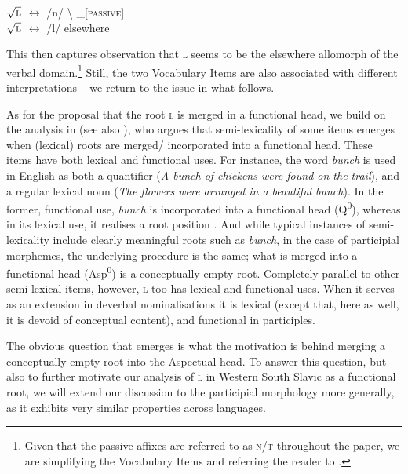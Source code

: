 \documentclass[output=paper,colorlinks,citecolor=brown]{langscibook}
\begin{document}
 \ea     $\sqrt{\textsc{l}}$  $\leftrightarrow$ /n/ \textbackslash \hspace{0.3cm} \_\textsc{[passive]}  \\
      \textcolor{white}{$\sqrt{\textsc{l}}$} $\leftrightarrow$ /l/ \hspace{0.3cm} elsewhere\\
   
\z 

\noindent This then captures  observation that \textsc{l} seems to be the elsewhere allomorph of the verbal domain.\footnote{Given that the passive affixes are referred to as \textsc{n/t} throughout the paper, we are simplifying the Vocabulary Items and referring the reader to \citet[92]{marvin2002}. } Still, the two Vocabulary Items are also associated with different interpretations -- we return to the issue in what follows. 


As for the proposal that the root \textsc{l} is merged in a functional head, we build on the analysis in \citet{Cavirani-Pots2020} (see also \citealt{Cavirani-Pots2021}), who argues that semi-lexicality of some items emerges when (lexical) roots are merged/ incorporated into a functional head. These  items  have both lexical and functional uses. For instance, the word \textit{bunch} is used in English as both a quantifier (\textit{A bunch of chickens were found on the trail}), and a regular lexical noun (\textit{The flowers were arranged in a beautiful bunch}). In the former, functional use, \textit{bunch} is incorporated into a functional head (Q\textsuperscript{0}), whereas in its lexical use, it realises a root position \citep{Cavirani-Pots2021}. And while typical instances of semi-lexicality include clearly meaningful roots such as \textit{bunch}, in the case of participial morphemes, the underlying procedure is the same; what is merged into a functional head (Asp\textsuperscript{0}) is a conceptually empty root. Completely parallel to other semi-lexical items, however, \textsc{l} too has lexical and functional uses. When it serves as an extension in deverbal nominalisations it is lexical (except that, here as well, it is devoid of conceptual content), and functional in participles. 

The obvious question that emerges is what the motivation is behind merging a conceptually empty root into the Aspectual head. To answer this question, but also to further motivate our analysis of \textsc{l} in Western South Slavic as a functional root, we will extend our discussion to the participial morphology more generally, as it exhibits very similar properties across languages. 
\end{document}
